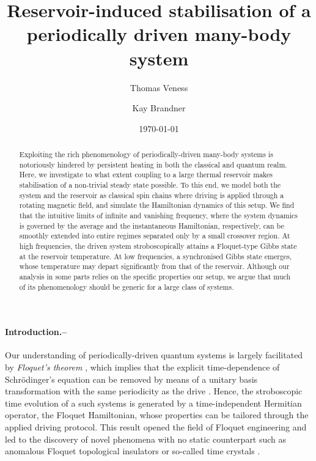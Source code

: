 \documentclass[prl,aps,twocolumn,notitlepage,10pt]{revtex4-1}
\begin{document}
\title{Reservoir-induced stabilisation of a periodically driven many-body system}
\date{\today}
\author{Thomas Veness}
\author{Kay Brandner}
\begin{abstract}
Exploiting the rich phenomenology of periodically-driven many-body systems is
notoriously hindered by persistent heating in both the classical and quantum
realm.
Here, we investigate to what extent coupling to a large thermal reservoir makes
stabilisation of a non-trivial steady state possible.
To this end, we model both the system and the reservoir as classical spin
chains where driving is applied through a rotating magnetic field, and simulate
the Hamiltonian dynamics of this setup. 
We find that the intuitive limits of infinite and vanishing frequency, where
the system dynamics is governed by the average and the instantaneous
Hamiltonian, respectively, can be smoothly extended into entire regimes
separated only by a small crossover region. 
At high frequencies, the driven system stroboscopically attains a Floquet-type
Gibbs state at the reservoir temperature. 
At low frequencies, a synchronised Gibbs state emerges, whose temperature may
depart significantly from that of the reservoir.
Although our analysis in some parts relies on the specific properties our
setup, we argue that much of its phenomenology should be generic for a large
class of systems.
\end{abstract}

\maketitle
{}
\paragraph{Introduction.--}
Our understanding of periodically-driven quantum systems is largely
facilitated by \emph{Floquet's theorem}
\cite{Kitagawa-Oka-Brataas-Fu-Demler,Sambe,Torres-Kunold}, which implies that
the explicit time-dependence of Schr\"{o}dinger's equation can be removed by
means of a unitary basis transformation with the same periodicity as the drive
\cite{Bukov-DAlessio-Polkovnikov-review,Eckardt-rmp}.
Hence, the stroboscopic time evolution of a such systems is generated by a
time-independent Hermitian operator, the Floquet Hamiltonian, whose properties
can be tailored through the applied driving protocol.
This result opened the field of Floquet engineering \cite{Weitenberg-Simonet}
and led to the discovery of novel phenomena with no static counterpart such as
anomalous Floquet topological insulators
\cite{Rubio-Abadal,Cayssol-Dora-Simon-Moessner} or so-called time crystals
\cite{Else-Bauer-Nayak,vonKeyserlingk-Khemani-Sondhi,Sacha-Zakrzewski}.
\end{document}
